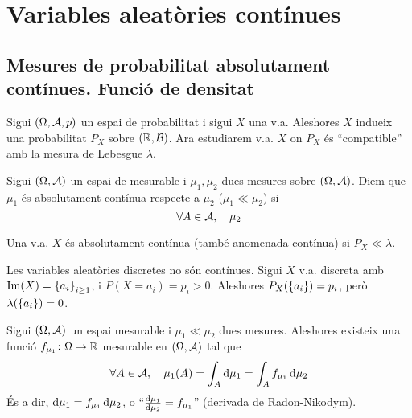 \chapter{Variables aleatòries contínues}

\section[Mesures de probabilitat absolutament contínues. Funció de densitat]
    {Mesures de probabilitat absolutament contínues. Funció de densitat
    }

Sigui $(\Omega,\mathcal{A},p)$ un espai de probabilitat i sigui $X$ una v.a. Aleshores $X$ indueix una probabilitat $P_X$ sobre $(\mathbb{R},\mathcal{B})$.
Ara estudiarem v.a. $X$ on $P_X$ és ``compatible'' amb la mesura de Lebesgue $\lambda$.
    
\begin{defi}
    Sigui $\left(\Omega,\mathcal{A}\right)$ un espai de mesurable i $\mu_1, \mu_2$ dues mesures sobre $\left(\Omega,\mathcal{A}\right)$. Diem que $\mu_1$ és
    absolutament contínua respecte a $\mu_2$ ($\mu_1 \ll \mu_2$) si
    \[\forall A \in \mathcal{A}, \quad \mu_2\]
\end{defi}

\begin{defi}
    Una v.a. $X$ és absolutament contínua (també anomenada contínua) si $P_X \ll \lambda$.
\end{defi}

\begin{obs}
    Les variables aleatòries discretes no són contínues.
    Sigui $X$ v.a. discreta amb $\operatorname{Im}(X) = \left\{ a_i \right\}_{i \ge 1}$, i $P(X=a_i)=p_i>0$.
    Aleshores $P_X(\left\{ a_i \right\})=p_i$, però $\lambda(\left\{ a_i \right\}) = 0$.
\end{obs}

\begin{teo}
    Sigui $(\Omega,\mathcal{A})$ un espai mesurable i $\mu_1 \ll \mu_2$ dues mesures.
    Aleshores existeix una funció $f_{\mu_1}\colon \Omega\to\mathbb{R}$ mesurable en $(\Omega,\mathcal{A})$ tal que
    \[\forall A \in\Asuc,\quad \mu_1(A) = \int_A \dif\mu_1 = \int_A f_{\mu_1}\dif\mu_2\]
    És a dir, $\dif\mu_1 = f_{\mu_1}\dif\mu_2$, o ``$\frac{\dif\mu_1}{\dif\mu_2} = f_{\mu_1}$'' (derivada de Radon-Nikodym).
\end{teo}

